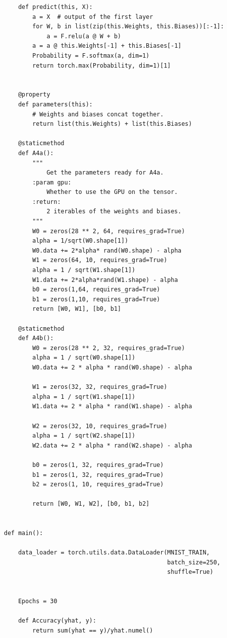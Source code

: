 \documentclass[]{article}
\begin{document}
\begin{lstlisting}
    def predict(this, X):
        a = X  # output of the first layer
        for W, b in list(zip(this.Weights, this.Biases))[:-1]:
            a = F.relu(a @ W + b)
        a = a @ this.Weights[-1] + this.Biases[-1]
        Probability = F.softmax(a, dim=1)
        return torch.max(Probability, dim=1)[1]


    @property
    def parameters(this):
        # Weights and biases concat together.
        return list(this.Weights) + list(this.Biases)

    @staticmethod
    def A4a():
        """
            Get the parameters ready for A4a.
        :param gpu:
            Whether to use the GPU on the tensor.
        :return:
            2 iterables of the weights and biases.
        """
        W0 = zeros(28 ** 2, 64, requires_grad=True)
        alpha = 1/sqrt(W0.shape[1])
        W0.data += 2*alpha* rand(W0.shape) - alpha
        W1 = zeros(64, 10, requires_grad=True)
        alpha = 1 / sqrt(W1.shape[1])
        W1.data += 2*alpha*rand(W1.shape) - alpha
        b0 = zeros(1,64, requires_grad=True)
        b1 = zeros(1,10, requires_grad=True)
        return [W0, W1], [b0, b1]

    @staticmethod
    def A4b():
        W0 = zeros(28 ** 2, 32, requires_grad=True)
        alpha = 1 / sqrt(W0.shape[1])
        W0.data += 2 * alpha * rand(W0.shape) - alpha

        W1 = zeros(32, 32, requires_grad=True)
        alpha = 1 / sqrt(W1.shape[1])
        W1.data += 2 * alpha * rand(W1.shape) - alpha

        W2 = zeros(32, 10, requires_grad=True)
        alpha = 1 / sqrt(W2.shape[1])
        W2.data += 2 * alpha * rand(W2.shape) - alpha

        b0 = zeros(1, 32, requires_grad=True)
        b1 = zeros(1, 32, requires_grad=True)
        b2 = zeros(1, 10, requires_grad=True)

        return [W0, W1, W2], [b0, b1, b2]


def main():

    data_loader = torch.utils.data.DataLoader(MNIST_TRAIN,
                                              batch_size=250,
                                              shuffle=True)


    Epochs = 30

    def Accuracy(yhat, y):
        return sum(yhat == y)/yhat.numel()


\end{lstlisting}
\end{document}
